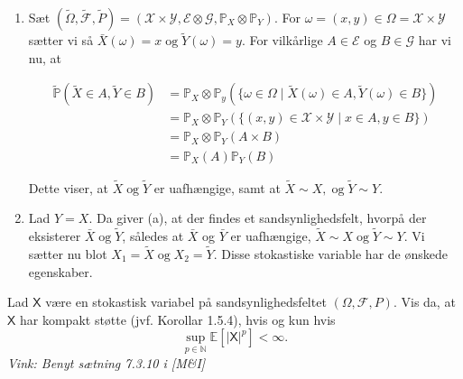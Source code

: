 \documentclass{Class}
\newcommand{\N}{\mathbb{N}}
\newcommand{\E}{\mathbb{E}}
\newcommand{\1}{\mathbbm{1}}
\newcommand{\X}{\mathsf{X}}
\newcommand{\pfield}{(\Omega, \mathcal{F}, P)}
\theoremstyle{boxed}
\begin{document}
\begin{enumerate}
  \item Sæt $(\tilde{\Omega}, \tilde{\mathcal{F}}, \tilde{P})=\left(\mathcal{X} \times \mathcal{Y}, \mathcal{E} \otimes \mathcal{G}, \mathbb{P}_X \otimes \mathbb{P}_Y\right)$. For $\omega=(x, y) \in \Omega=\mathcal{X} \times \mathcal{Y}$ sætter vi så $\bar{X}(\omega)=x \operatorname{og} \tilde{Y}(\omega)=y$. For vilkårlige $A \in \mathcal{E}$ og $B \in \mathcal{G}$ har vi nu, at

  $$
  \begin{aligned}
  \tilde{\mathbb{P}}(\tilde{X} \in A, \tilde{Y} \in B) & =\mathbb{P}_X \otimes \mathbb{P}_y(\{\omega \in \Omega \mid \tilde{X}(\omega) \in A, \tilde{Y}(\omega) \in B\}) \\
  & =\mathbb{P}_X \otimes \mathbb{P}_Y(\{(x, y) \in \mathcal{X} \times \mathcal{Y} \mid x \in A, y \in B\}) \\
  & =\mathbb{P}_X \otimes \mathbb{P}_Y(A \times B) \\
  & =\mathbb{P}_X(A) \mathbb{P}_Y(B)
  \end{aligned}
  $$
  
  
  Dette viser, at $\tilde{X} \operatorname{og} \tilde{Y}$ er uafhængige, samt at $\tilde{X} \sim X, \operatorname{og} \tilde{Y} \sim Y$.
  \item Lad $Y=X$. Da giver (a), at der findes et sandsynlighedsfelt, hvorpå der eksisterer $\bar{X} \operatorname{og} \tilde{Y}$, således at $\bar{X}$ og $\bar{Y}$ er uafhængige, $\tilde{X} \sim X \operatorname{og} \tilde{Y} \sim Y$. Vi sætter nu blot $X_1=\tilde{X} \operatorname{og} X_2=\tilde{Y}$. Disse stokastiske variable har de ønskede egenskaber.
\end{enumerate}
Lad $\X$ være en stokastisk variabel på sandsynlighedsfeltet $\pfield$. Vis da, at $\X$ har kompakt støtte (jvf. Korollar 1.5.4), hvis og kun hvis $$\sup_{p\in\N}\E[|\X|^p]<\infty.$$ \textit{Vink: Benyt sætning 7.3.10 i [M\&I]}
\solution
\end{document}
